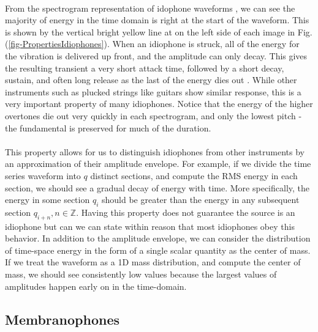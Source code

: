 \documentclass[12pt,letterpaper]{article}
\begin{document}
\paragraph*{}From the spectrogram representation of idophone waveforms , we can see the majority of energy in the time domain is right at the start of the waveform. This is shown by the vertical bright yellow line at on the left side of each image in Fig. (\ref{fig-PropertiesIdiophones}). When an idiophone is struck, all of the energy for the vibration is delivered up front, and the amplitude can only decay. This gives the resulting transient a very short attack time, followed by a short decay, sustain, and often long release as the last of the energy dies out \cite{White}. While other instruments such as plucked strings like guitars show similar response, this is a very important property of many idiophones. Notice that the energy of the higher overtones die out very quickly in each spectrogram, and only the lowest pitch - the fundamental is preserved for much of the duration.

\paragraph*{}This property allows for us to distinguish idiophones from other instruments by an approximation of their amplitude envelope. For example, if we divide the time series waveform into $q$ distinct sections, and compute the RMS energy in each section, we should see a gradual decay of energy with time. More specifically, the energy in some section $q_i$ should be greater than the energy in any subsequent section $q_{i + n}, n \in \mathbb{Z}$. Having this property does not guarantee the source is an idiophone but can we can state within reason that most idiophones obey this behavior. In addition to the amplitude envelope, we can consider the distribution of time-space energy in the form of a single scalar quantity as the center of mass. If we treat the waveform as a 1D mass distribution, and compute the center of mass, we should see consistently low values because the largest values of amplitudes happen early on in the time-domain.


\subsection{Membranophones}
\label{subsec-membranophones}
\end{document}
